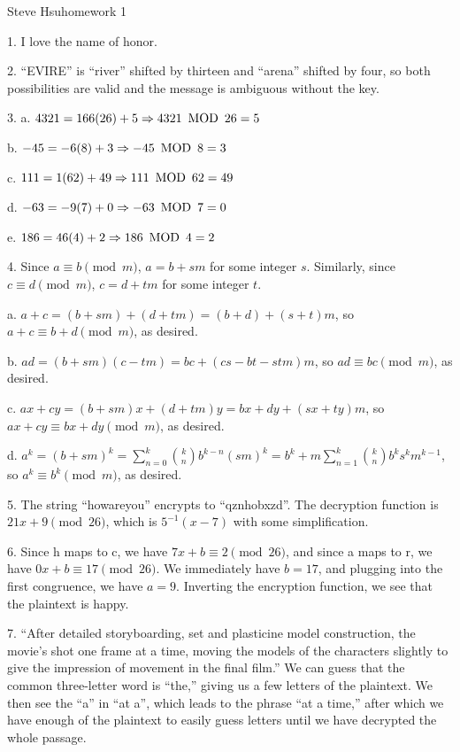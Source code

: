 \def\MOD{\enspace{\rm MOD}\enspace}
\centerline{Steve Hsu\hfill homework 1}
\item{1.} I love the name of honor.
\bigskip
\item{2.} ``EVIRE'' is ``river'' shifted by thirteen
and ``arena'' shifted by four, so both possibilities are valid
and the message is ambiguous without the key.
\bigskip
\item{3.} a. $4321 = 166(26) + 5 \Rightarrow 4321 \MOD 26 = 5$
\medskip
\item{} b. $-45 = -6(8) + 3 \Rightarrow -45 \MOD 8 = 3$
\medskip
\item{} c. $111 = 1(62) + 49 \Rightarrow 111 \MOD 62 = 49$
\medskip
\item{} d. $-63 = -9(7) + 0 \Rightarrow -63 \MOD 7 = 0$
\medskip
\item{} e. $186 = 46(4) + 2 \Rightarrow 186 \MOD 4 = 2$
\bigskip
\item{4.} Since $a \equiv b \pmod m$,
$a = b + sm$ for some integer $s$.
Similarly, since $c \equiv d \pmod m$,
$c = d + tm$ for some integer $t$.
\medskip
\item{} a. $a + c = (b + sm) + (d + tm) = (b + d) + (s + t)m$,
so $a + c \equiv b + d \pmod m$, as desired.
\medskip
\item{} b. $ad = (b + sm)(c - tm) = bc + (cs - bt - stm)m$,
so $ad \equiv bc \pmod m$, as desired.
\medskip
\item{} c. $ax + cy = (b + sm)x + (d + tm)y = bx + dy + (sx + ty)m$,
so $ax + cy \equiv bx + dy \pmod m$, as desired.
\medskip
\item{} d. $a^k = (b + sm)^k = \sum _{n=0}^k {k \choose n}b^{k-n}(sm)^k
= b^k + m\sum _{n=1}^{k} {k \choose n}b^k s^k m^{k-1}$,
so $a^k \equiv b^k \pmod m$, as desired.
\bigskip
\item{5.} The string ``howareyou'' encrypts to ``qznhobxzd''.
The decryption function is $21x + 9 \pmod{26}$,
which is $5^{-1}(x - 7)$ with some simplification.
\bigskip
\item{6.} Since h maps to c, we have $7x + b \equiv 2 \pmod{26}$,
and since a maps to r, we have $0x + b \equiv 17 \pmod{26}$.
We immediately have $b = 17$, and plugging into the first congruence,
we have $a = 9$.
Inverting the encryption function, we see that the plaintext is happy.
\bigskip
\item{7.} ``After detailed storyboarding, set and plasticine model
construction, the movie's shot one frame at a time, moving the models
of the characters slightly to give the impression of movement
in the final film.''
\medskip
We can guess that the common three-letter word is ``the,''
giving us a few letters of the plaintext.
We then see the ``a'' in ``at a'', which leads to the phrase
``at a time,'' after which we have enough of the plaintext
to easily guess letters until we have decrypted the whole passage.
\bye
